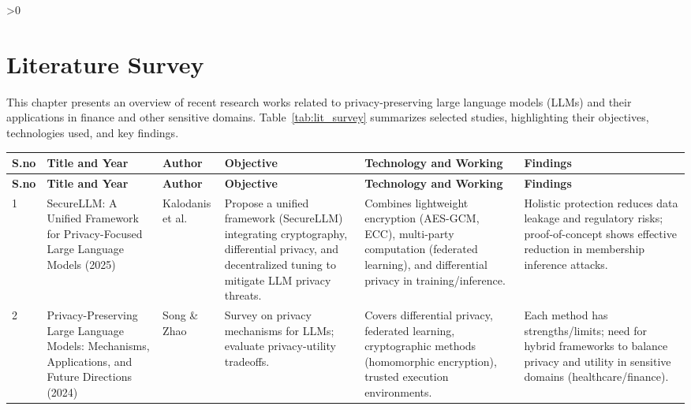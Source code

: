 \documentclass[12pt,a4paper]{report}
\renewcommand{\arraystretch}{1.3} %
\let\oldchapter\chapter
\renewcommand{\chapter}{\ifnum\value{chapter}>0 \clearpage\pagestyle{fancy}\fi\oldchapter}
\renewcommand{\arraystretch}{1.3} %
\begin{document}
\chapter{Literature Survey}
This chapter presents an overview of recent research works related to privacy-preserving large language models (LLMs) and their applications in finance and other sensitive domains. Table~\ref{tab:lit_survey} summarizes selected studies, highlighting their objectives, technologies used, and key findings.
\renewcommand{\arraystretch}{1.2} 
\setlength{\tabcolsep}{4pt}
\begin{longtable}{|>{\centering\arraybackslash}p{}|
                  >{\centering\arraybackslash}p{}|
                  >{\centering\arraybackslash}p{}|
                  >{\centering\arraybackslash}p{}|
                  >{\centering\arraybackslash}p{}|
                  >{\centering\arraybackslash}p{}|}
\hline
\textbf{S.no} & \textbf{Title and Year} & \textbf{Author} & \textbf{Objective} & \textbf{Technology and Working} & \textbf{Findings} \\
\hline
\endfirsthead

\hline
\textbf{S.no} & \textbf{Title and Year} & \textbf{Author} & \textbf{Objective} & \textbf{Technology and Working} & \textbf{Findings} \\
\hline
\endhead

1 & SecureLLM: A Unified Framework for Privacy-Focused Large Language Models (2025) & Kalodanis et al. & Propose a unified framework (SecureLLM) integrating cryptography, differential privacy, and decentralized tuning to mitigate LLM privacy threats. & Combines lightweight encryption (AES-GCM, ECC), multi-party computation (federated learning), and differential privacy in training/inference. & Holistic protection reduces data leakage and regulatory risks; proof-of-concept shows effective reduction in membership inference attacks. \\ \hline

2 & Privacy-Preserving Large Language Models: Mechanisms, Applications, and Future Directions (2024) & Song \& Zhao & Survey on privacy mechanisms for LLMs; evaluate privacy-utility tradeoffs. & Covers differential privacy, federated learning, cryptographic methods (homomorphic encryption), trusted execution environments. & Each method has strengths/limits; need for hybrid frameworks to balance privacy and utility in sensitive domains (healthcare/finance). \\ \hline


\end{longtable}
\end{document}
